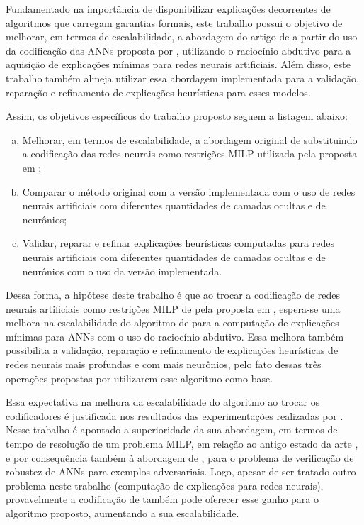 Fundamentado na importância de disponibilizar explicações decorrentes de algoritmos que carregam garantias formais, este trabalho possui o objetivo de melhorar, em termos de escalabilidade, a abordagem do artigo de  a partir do uso da codificação das ANNs proposta por , utilizando o raciocínio abdutivo para a aquisição de explicações mínimas para redes neurais artificiais. Além disso, este trabalho também almeja utilizar essa abordagem implementada para a validação, reparação e refinamento de explicações heurísticas para esses modelos.


Assim, os objetivos específicos do trabalho proposto seguem a listagem abaixo:
\begin{enumerate}[a)]
    \item Melhorar, em termos de escalabilidade, a abordagem original de  substituindo a codificação das redes neurais como restrições MILP utilizada pela proposta em ;
    \item Comparar o método original com a versão implementada com o uso de redes neurais artificiais com diferentes quantidades de camadas ocultas e de neurônios;
    \item Validar, reparar e refinar explicações heurísticas computadas para redes neurais artificiais com diferentes quantidades de camadas ocultas e de neurônios com o uso da versão implementada.
\end{enumerate}

Dessa forma, a hipótese deste trabalho é que ao trocar a codificação de redes neurais artificiais como restrições MILP de  pela proposta em , espera-se uma melhora na escalabilidade do algoritmo de  para a computação de explicações mínimas para ANNs com o uso do raciocínio abdutivo. Essa melhora também possibilita a validação, reparação e refinamento de explicações heurísticas de redes neurais mais profundas e com mais neurônios, pelo fato dessas três operações propostas por  utilizarem esse algoritmo como base. 

Essa expectativa na melhora da escalabilidade do algoritmo ao trocar os codificadores é justificada nos resultados das experimentações realizadas por . Nesse trabalho é apontado a superioridade da sua abordagem, em termos de tempo de resolução de um problema MILP, em relação ao antigo estado da arte \cite{reluplex}, e por consequência também à abordagem de , para o problema de verificação de robustez de ANNs para exemplos adversariais. Logo, apesar de ser tratado outro problema neste trabalho (computação de explicações para redes neurais), provavelmente a codificação de  também pode oferecer esse ganho para o algoritmo proposto, aumentando a sua escalabilidade.

